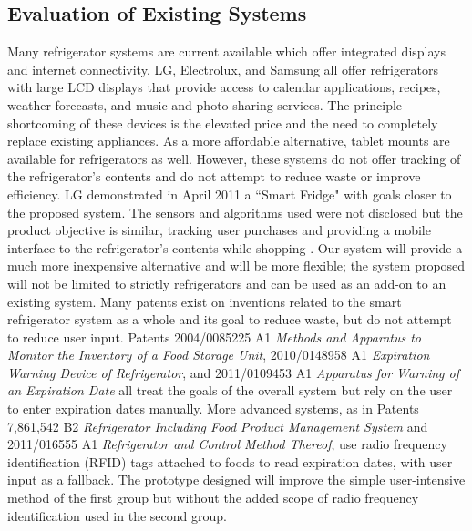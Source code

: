 \documentclass[11pt]{article} %
\begin{document}
\subsection{Evaluation of Existing Systems}
Many refrigerator systems are current available which offer integrated displays and internet connectivity. LG, Electrolux, and Samsung all offer refrigerators with large LCD displays that provide access to calendar applications, recipes, weather forecasts, and music and photo sharing services. The principle shortcoming of these devices is the elevated price and the need to completely replace existing appliances. As a more affordable alternative, tablet mounts are available for refrigerators as well.
However, these systems do not offer tracking of the refrigerator's contents and do not attempt to reduce waste or improve efficiency. LG demonstrated in April 2011 a ``Smart Fridge" with goals closer to the proposed system. The sensors and algorithms used were not disclosed but the product objective is similar, tracking user purchases and providing a mobile interface to the refrigerator's contents while shopping \cite{lg}. Our system will provide a much more inexpensive alternative and will be more flexible; the system proposed will not be limited to strictly refrigerators and can be used as an add-on to an existing system.
\newline \quad \newline
Many patents exist on inventions related to the smart refrigerator system as a whole and its goal to reduce waste, but do not attempt to reduce user input. Patents 2004/0085225 A1 \emph{Methods and Apparatus to Monitor the Inventory of a Food Storage Unit}, 2010/0148958 A1 \emph{Expiration Warning Device of Refrigerator}, and 2011/0109453 A1 \emph{Apparatus for Warning of an Expiration Date} all treat the goals of the overall system but rely on the user to enter expiration dates manually. More advanced systems, as in Patents 7,861,542 B2 \emph{Refrigerator Including Food Product Management System} and 2011/016555 A1 \emph {Refrigerator and Control Method Thereof}, use radio frequency identification (RFID) tags attached to foods to read expiration dates, with user input as a fallback. The prototype designed will improve the simple user-intensive method of the first group but without the added scope of radio frequency identification used in the second group.
\end{document}
